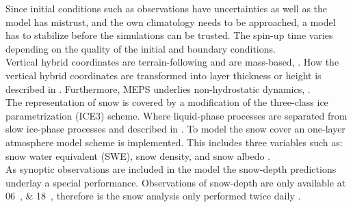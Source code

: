 Since initial conditions such as observations have uncertainties as well as the model has mistrust, and  the own climatology needs to be approached, a model has to stabilize before the simulations can be trusted. The spin-up time varies depending on the quality of the initial and boundary conditions. 
\\
Vertical hybrid coordinates are terrain-following and are mass-based, \citep{muller_arome-metcoop:_2017}. How the vertical hybrid coordinates are transformed into layer thickness or height is described in . Furthermore, MEPS underlies non-hydrostatic dynamics, \cite{metcoop_wiki_description_2017}.
\\
The representation of snow is covered by a modification of the three-class ice parametrization (ICE3) scheme. Where liquid-phase processes are separated from slow ice-phase processes and described in . To model the snow cover an one-layer atmosphere model scheme is implemented. This includes three variables such as: snow water equivalent (SWE), snow density, and snow albedo \citep{muller_arome-metcoop:_2017}.
\\
As synoptic observations are included in the model the snow-depth predictions underlay a special performance. Observations of snow-depth are only available at \SIlist{06;18}{\UTC}, therefore is the snow analysis only performed twice daily \citep{muller_arome-metcoop:_2017, homleid_verification_2016}. 

